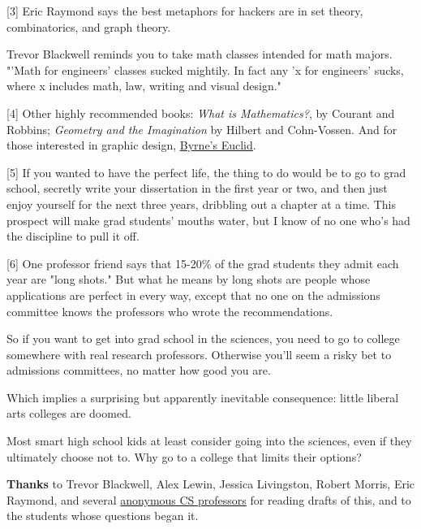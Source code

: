 [3] Eric Raymond says the
                    best metaphors for hackers are in set theory, combinatorics,
                    and graph theory.

Trevor Blackwell reminds you to
                    take math classes intended for math majors. "'Math for
                    engineers' classes sucked mightily. In fact any 'x for
                    engineers' sucks, where x includes math, law, writing and
                    visual design."

[4] Other highly recommended
                    books: \emph{What is Mathematics?}, by Courant and Robbins;
                    \emph{Geometry and the Imagination} by Hilbert and
                    Cohn-Vossen. And for those interested in graphic design,
                    \href{http://www.math.ubc.ca/people/faculty/cass/Euclid/byrne.html}{Byrne's Euclid}.


                    [5] If you wanted to have the perfect life, the thing to do
                    would be to go to grad school, secretly write your
                    dissertation in the first year or two, and then just enjoy
                    yourself for the next three years, dribbling out a chapter
                    at a time. This prospect will make grad students' mouths
                    water, but I know of no one who's had the discipline to pull
                    it off.

[6] One professor friend says that 15-20\%
                    of the grad students they admit each year are "long shots."
                    But what he means by long shots are people whose
                    applications are perfect in every way, except that no one on
                    the admissions committee knows the professors who wrote the
                    recommendations.

So if you want to get into grad
                    school in the sciences, you need to go to college somewhere
                    with real research professors. Otherwise you'll seem a risky
                    bet to admissions committees, no matter how good you are.

Which
                    implies a surprising but apparently inevitable consequence:
                    little liberal arts colleges are doomed.
                    
                    Most smart high school kids at least consider going into the
                    sciences, even if they ultimately choose not to. Why go to a
                    college that limits their options?



\textbf{Thanks}
                    to Trevor Blackwell, Alex Lewin, Jessica Livingston, Robert
                    Morris, Eric Raymond, and several
                    \href{http://www.paulgraham.com/undergrad2.html}{anonymous CS professors}
                    for reading drafts of this, and to the students whose
                    questions began it.




              
            
          
